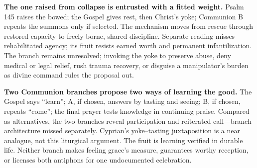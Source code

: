 \noindent\textbf{The one raised from collapse is entrusted with a fitted weight.\enspace{}}
Psalm 145 raises the bowed; the Gospel gives rest, then Christ's yoke; Communion B repeats the summons only if selected. The mechanism moves from rescue through restored capacity to freely borne, shared discipline. Separate reading misses rehabilitated agency; its fruit resists earned worth and permanent infantilization. The branch remains unresolved; invoking the yoke to preserve abuse, deny medical or legal relief, rush trauma recovery, or disguise a manipulator's burden as divine command rules the proposal out.

\noindent\textbf{Two Communion branches propose two ways of learning the good.\enspace{}}
The Gospel says “learn”; A, if chosen, answers by tasting and seeing; B, if chosen, repeats “come”; the final prayer tests knowledge in continuing praise. Compared as alternatives, the two branches reveal participation and reiterated call---branch architecture missed separately. Cyprian's yoke--tasting juxtaposition is a near analogue, not this liturgical argument. The fruit is learning verified in durable life. Neither branch makes feeling grace's measure, guarantees worthy reception, or licenses both antiphons for one undocumented celebration.
